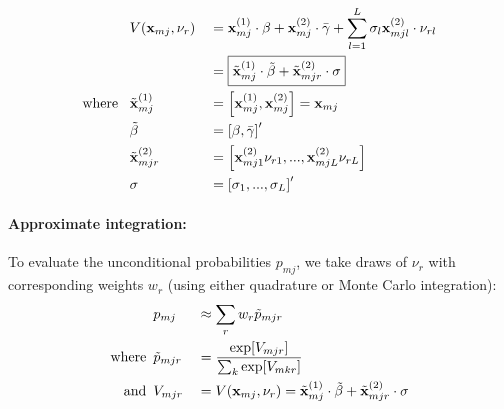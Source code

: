 \documentclass[12pt]{article}
\begin{document}
\begin{equation}
\begin{aligned}
	& V(\textbf{x}_{mj}, \nu_r) && = \textbf{x}^{(1)}_{mj} \cdot \beta + \textbf{x}^{(2)}_{mj} \cdot \bar{\gamma} + \sum_{l=1}^L \sigma_l \textbf{x}^{(2)}_{mjl} \cdot \nu_{rl} \\
	&  && = \boxed{ \tilde{\textbf{x}}^{(1)}_{mj} \cdot \tilde{\beta} + \tilde{\textbf{x}}^{(2)}_{mjr} \cdot \sigma } \\
	\text{where } \hspace*{5pt} & \tilde{\textbf{x}}^{(1)}_{mj} && = \left[ \textbf{x}^{(1)}_{mj},  \textbf{x}^{(2)}_{mj} \right] = \textbf{x}_{mj} \\
	\text{ } & \tilde{\beta} && = \left[\beta,  \bar{\gamma} \right]' \\
	& \tilde{\textbf{x}}^{(2)}_{mjr} && = \left[ \textbf{x}^{(2)}_{mj1}  \nu_{r1} , ..., \textbf{x}^{(2)}_{mjL}  \nu_{rL}  \right] \\
	\text{ } & \sigma && = \left[\sigma_1, ..., \sigma_L \right]' \\
\end{aligned}
\end{equation}

\paragraph{Approximate integration: \\}
To evaluate the unconditional probabilities $p_{mj}$, we take draws of $\nu_r$ with corresponding weights $w_r$ (using either quadrature or Monte Carlo integration):
\begin{equation}
\begin{aligned}
	& p_{mj} && \approx \sum_r w_r  \tilde{p}_{mjr} \\
	\text{where} \hspace*{5pt} & \tilde{p}_{mjr} && =  \frac{\exp[V_{mjr}]}{ \sum_k \exp[V_{mkr}]} \\
	\text{and} \hspace*{5pt} & V_{mjr} && = V(\textbf{x}_{mj}, \nu_r) = \tilde{\textbf{x}}^{(1)}_{mj} \cdot \tilde{\beta} + \tilde{\textbf{x}}^{(2)}_{mjr} \cdot \sigma \\
\end{aligned}
\end{equation}
\end{document}
